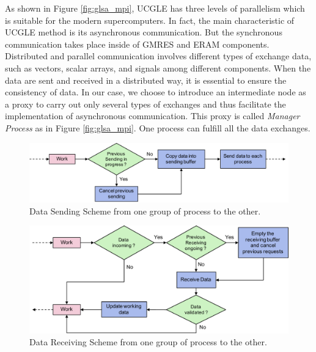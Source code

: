As shown in Figure \ref{fig:glsa_mpi}, UCGLE has three levels of parallelism which is suitable for the modern supercomputers. In fact, the main characteristic of UCGLE method is its asynchronous communication. But the synchronous communication takes place inside of GMRES and ERAM components. Distributed and parallel communication involves different types of exchange data, such as vectors, scalar arrays, and signals among different components. When the data are sent and received in a distributed way, it is essential to ensure the consistency of data. In our case, we choose to introduce an intermediate node as a proxy to carry out only several types of exchanges and thus facilitate the implementation of asynchronous communication. This proxy is called \textit{Manager Process} as in Figure \ref{fig:glsa_mpi}. One process can fulfill all the data exchanges.

\begin{figure}[htbp]
	\centering
	\includegraphics[width=6.2in]{fig/send.pdf}
	\caption{Data Sending Scheme from one group of process to the other.}
	\label{fig:send}
\end{figure}

\begin{figure}[t]
	\centering
	\includegraphics[width=6.2in]{fig/recv.pdf}
	\caption{Data Receiving Scheme from one group of process to the other.}
	\label{fig:recv}
\end{figure}

